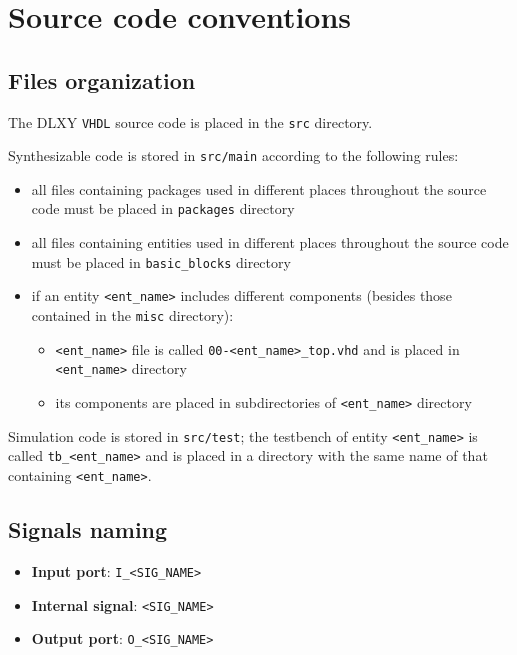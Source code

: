 \chapter{Source code conventions}
\label{app:code_conventions}

\section{Files organization}
The DLXY \texttt{VHDL} source code is placed in the \texttt{src} directory.

\bigskip
Synthesizable code is stored in \texttt{src/main} according to the following rules:
\begin{itemize}
	\item all files containing packages used in different places throughout
		the source code must be placed in \texttt{packages} directory
	\item all files containing entities used in different places throughout
		the source code must be placed in \texttt{basic\_blocks} directory
	\item if an entity \texttt{<ent\_name>} includes different components
		(besides those contained in the \texttt{misc} directory):
		\begin{itemize}
			\item \texttt{<ent\_name>} file is called \texttt{00-<ent\_name>\_top.vhd}
				and is placed in \texttt{<ent\_name>} directory
			\item its components are placed in subdirectories of \texttt{<ent\_name>}
				directory
		\end{itemize}
\end{itemize}

Simulation code is stored in \texttt{src/test}; the testbench of entity
\texttt{<ent\_name>} is called \texttt{tb\_<ent\_name>} and is placed in a
directory with the same name of that containing \texttt{<ent\_name>}.

\section{Signals naming}
\begin{itemize}
	\item \textbf{Input port}: \texttt{I\_<SIG\_NAME>}
	\item \textbf{Internal signal}: \texttt{<SIG\_NAME>}
	\item \textbf{Output port}: \texttt{O\_<SIG\_NAME>}
\end{itemize}

